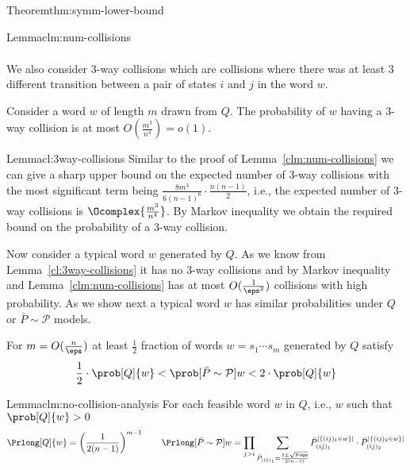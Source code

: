 \begin{prevproof}{Theorem}{thm:symm-lower-bound}
\begin{prevproof}{Lemma}{clm:num-collisions}
\begin{align*}
	\end{align*}
\end{prevproof}

We also consider 3-way collisions which are collisions where there was at least 3 different transition between a pair of states $i$ and $j$ in the word $w$. 

\begin{lemma}
	\label{cl:3way-collisions}
	Consider a word $w$ of length $m$ drawn from $Q$. The probability of $w$ having a $3$-way collision is at most $O(\frac{m^3}{n^4})=o(1).$
\end{lemma}
\begin{prevproof}{Lemma}{cl:3way-collisions}
	Similar to the proof of Lemma~\ref{clm:num-collisions} we can give a sharp upper bound on the expected number of $3$-way collisions with the most significant term
	being $\frac{8m^3}{6 (n-1)^6}\cdot\frac{n(n-1)}{2}$, i.e., the expected number of $3$-way collisions is $\Ocomplex{\frac{m^3}{n^4}}$. By Markov inequality we  
	obtain the required bound on the probability of a $3$-way collision.   
\end{prevproof}

Now consider a typical word $w$ generated by $Q$. 
As we know from Lemma~\ref{cl:3way-collisions} it has no 3-way collisions and by Markov inequality
and Lemma~\ref{clm:num-collisions} has at most $O(\frac{1}{\eps^2})$ collisions with high probability. As we show next a typical word $w$ has similar probabilities under $Q$ or 
$\bar{P}\sim\mathcal{P}$ models.

\begin{lemma}
	\label{clm:no-collision-analysis}
	For $m=O(\frac{n}{\eps})$ at least $\frac{1}{2}$ fraction of words $w=s_1\cdots s_m$ generated by $Q$ satisfy 
	\[
	\frac{1}{2}\cdot\prob[Q]{w}<\prob[\bar{P}\sim \mathcal{P}]{w} < 2\cdot \prob[Q]{w}
	\]
\end{lemma}
\begin{prevproof}{Lemma}{clm:no-collision-analysis}
	For each feasible word $w$ in $Q$, i.e., $w$ such that $\prob[Q]{w}>0$
	\[
	\Prlong[Q]{w}=\left(\frac{1}{2(n-1)}\right)^{m-1}
	\quad\quad 
	\Prlong[\bar{P}\sim\mathcal{P}]{w}=\prod_{j>i}\sum_{\bar{P}_{(ij)_1}=\frac{1\pm\sqrt{8\eps}}{2(n-1)}} \bar{P}_{(ij)_1}^{|\{(ij)_1\in w\}|} \cdot\bar{P}_{(ij)_2}^{|\{(ij)_2\in w\}|} 
	\]
	

\end{prevproof}
\end{prevproof}
